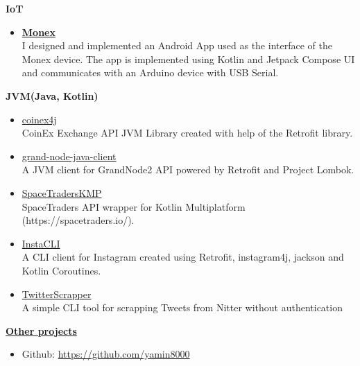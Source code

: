 \begin{multicols}{2}
\begin{description}
        \item \textbf{IoT}
        \begin{itemize}
            \item \href{https://hirkaniafaratech.ir/2024-01-04/mehran/252}{\textbf{Monex}}\\
            I designed and implemented an Android App used as the interface of the Monex device.
            The app is implemented using Kotlin and Jetpack Compose UI and communicates with an Arduino device with USB Serial.
        \end{itemize}
        \item \textbf{JVM(Java, Kotlin)}
        \begin{itemize}
            \item \href{https://github.com/yamin8000/coinex4j}{coinex4j}\\
            CoinEx Exchange API JVM Library created with help of the Retrofit library.
            \item \href{https://github.com/TradersTeam/grand-node-java-client}{grand-node-java-client}\\
            A JVM client for GrandNode2 API powered by Retrofit and Project Lombok.
            \item \href{https://github.com/yamin8000/SpaceTradersKMP}{SpaceTradersKMP}\\
            SpaceTraders API wrapper for Kotlin Multiplatform (https://spacetraders.io/).
            \item \href{https://github.com/yamin8000/InstaCLI}{InstaCLI}\\
            A CLI client for Instagram created using Retrofit, instagram4j, jackson and Kotlin Coroutines.
            \item \href{https://github.com/yamin8000/TwitterScrapper}{TwitterScrapper}\\
            A simple CLI tool for scrapping Tweets from Nitter without authentication
        \end{itemize}
        \item \href{https://github.com/yamin8000}{\textbf{Other projects}}
        \begin{itemize}
            \item Github: \href{https://github.com/yamin8000}{https://github.com/yamin8000}
        \end{itemize}
    \end{description}
\end{multicols}